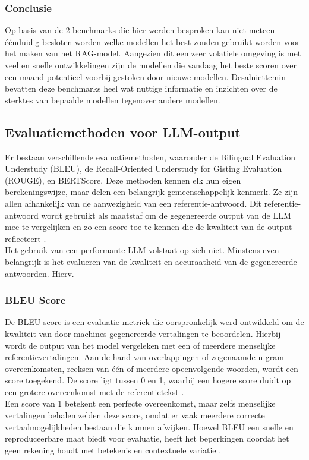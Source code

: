 \subsubsection{Conclusie}

Op basis van de 2 benchmarks die hier werden besproken kan niet meteen éénduidig besloten worden welke modellen het best zouden gebruikt worden voor het maken van het RAG-model. Aangezien dit een zeer volatiele omgeving is met veel en snelle ontwikkelingen zijn de modellen die vandaag het beste scoren over een maand potentieel voorbij gestoken door nieuwe modellen. Desalniettemin bevatten deze benchmarks heel wat nuttige informatie en inzichten over de sterktes van bepaalde modellen tegenover andere modellen. 

\subsection{Evaluatiemethoden voor LLM-output}
Er bestaan verschillende evaluatiemethoden, waaronder de Bilingual Evaluation Understudy (BLEU), de Recall-Oriented Understudy for Gisting Evaluation (ROUGE), en BERTScore. Deze methoden kennen elk hun eigen berekeningswijze, maar delen een belangrijk gemeenschappelijk kenmerk. Ze zijn allen afhankelijk van de aanwezigheid van een referentie-antwoord. Dit referentie-antwoord wordt gebruikt als maatstaf om de gegenereerde output van de LLM mee te vergelijken en zo een score toe te kennen die de kwaliteit van de output reflecteert \autocite{microsoft2024evaluation}.
\\[1em]
Het gebruik van een performante LLM volstaat op zich niet. Minstens even belangrijk is het evalueren van de kwaliteit en accuraatheid van de gegenereerde antwoorden. Hierv.

\subsubsection{BLEU Score}

De BLEU score is een evaluatie metriek die oorspronkelijk werd ontwikkeld om de kwaliteit van door machines gegenereerde vertalingen te beoordelen. Hierbij wordt de output van het model vergeleken met een of meerdere menselijke referentievertalingen. Aan de hand van overlappingen of zogenaamde n-gram overeenkomsten, reeksen van één of meerdere opeenvolgende woorden, wordt een score toegekend. De score ligt tussen 0 en 1, waarbij een hogere score duidt op een grotere overeenkomst met de referentietekst \autocite{papineni-etal-2002-bleu}.
\\[1em]
Een score van 1 betekent een perfecte overeenkomst, maar zelfs menselijke vertalingen behalen zelden deze score, omdat er vaak meerdere correcte vertaalmogelijkheden bestaan die kunnen afwijken. Hoewel BLEU een snelle en reproduceerbare maat biedt voor evaluatie, heeft het beperkingen doordat het geen rekening houdt met betekenis en contextuele variatie \autocite{papineni-etal-2002-bleu}.

